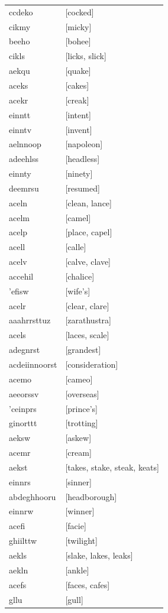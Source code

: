 \documentclass{article}
\begin{document}
\begin{tabular}{ll}
ccdeko & [cocked] \\
cikmy & [micky] \\
beeho & [bohee] \\
cikls & [licks, slick] \\
aekqu & [quake] \\
aceks & [cakes] \\
acekr & [creak] \\
einntt & [intent] \\
einntv & [invent] \\
aelnnoop & [napoleon] \\
adeehlss & [headless] \\
einnty & [ninety] \\
deemrsu & [resumed] \\
aceln & [clean, lance] \\
acelm & [camel] \\
acelp & [place, capel] \\
acell & [calle] \\
acelv & [calve, clave] \\
accehil & [chalice] \\
'efisw & [wife's] \\
acelr & [clear, clare] \\
aaahrrsttuz & [zarathustra] \\
acels & [laces, scale] \\
adegnrst & [grandest] \\
acdeiinnoorst & [consideration] \\
acemo & [cameo] \\
aeeorssv & [overseas] \\
'ceinprs & [prince's] \\
ginorttt & [trotting] \\
aeksw & [askew] \\
acemr & [cream] \\
aekst & [takes, stake, steak, keats] \\
einnrs & [sinner] \\
abdeghhooru & [headborough] \\
einnrw & [winner] \\
acefi & [facie] \\
ghiilttw & [twilight] \\
aekls & [slake, lakes, leaks] \\
aekln & [ankle] \\
acefs & [faces, cafes] \\
gllu & [gull] \\

\end{tabular}
\end{document}
